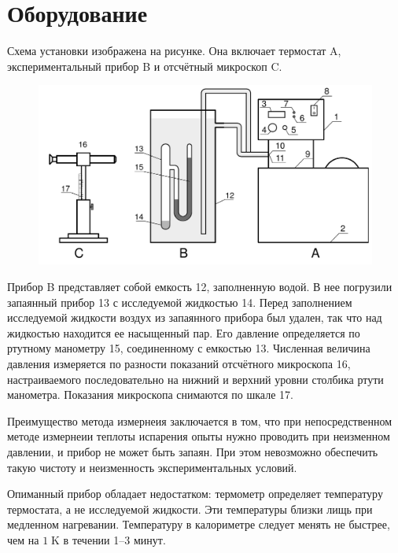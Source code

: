 \section{Оборудование}

Схема установки изображена на рисунке. Она включает термостат A, экспериментальный прибор B
и отсчётный микроскоп C. 

\begin{figure}[ht!]
    \centering\includegraphics[width=0.8\linewidth]{img/cal.png}
\end{figure}

Прибор B представляет собой емкость 12, заполненную водой. В нее погрузили запаянный прибор 13 с
исследуемой жидкостью 14. Перед заполнением исследуемой жидкости воздух из запаянного прибора
был удален, так что над жидкостью находится ее насыщенный пар. Его давление определяется по ртутному
манометру 15, соединенному с емкостью 13. Численная величина давления измеряется по разности
показаний отсчётного микроскопа 16, настраиваемого последовательно на нижний и верхний
уровни столбика ртути манометра. Показания микроскопа снимаются по шкале 17.

Преимущество метода измернеия заключается в том, что при непосредственном методе измернеии
теплоты испарения опыты нужно проводить при неизменном давлении, и прибор не может быть запаян.
При этом невозможно обеспечить такую чистоту и неизменность экспериментальных условий.

Опиманный прибор обладает недостатком: термометр определяет температуру термостата, а не
исследуемой жидкости. Эти температуры близки лищь при медленном нагревании. Температуру в калориметре
следует менять не быстрее, чем на $1\;\text{K}$ в течении 1--3 минут.
